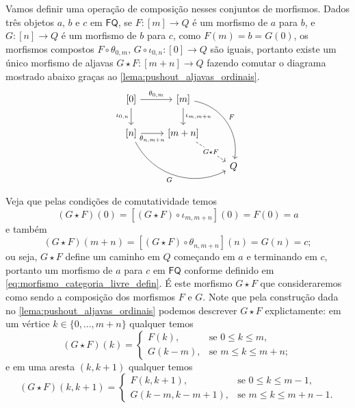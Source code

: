 Vamos definir uma operação de composição nesses conjuntos de morfismos.
Dados três objetos $a$, $b$ e $c$ em $\mathsf{FQ}$, se $F:[m] \to Q$ é um morfismo de $a$ para $b$, e $G:[n] \to Q$ é um morfismo de $b$ para $c$, como $F(m) = b = G(0)$, os morfismos compostos $F \circ \theta_{0,m},\, G \circ \iota_{0,n}: [0] \to Q$ são iguais, portanto existe um único morfismo de aljavas $G \star F: [m+n] \to Q$ fazendo comutar o diagrama mostrado abaixo graças ao \cref{lema:pushout_aljavas_ordinais}.
\begin{displaymath}
    \begin{tikzcd}
        {[0]}
        \arrow[r, "{\theta_{0,m}}"]
        \arrow[d, "{\iota_{0,n}}" swap]
        & {[m]}
        \arrow[d, "\iota_{m,m+n}"]
        \arrow[rdd, bend left=45, "F"]
        \\ {[n]}
        \arrow[r, "{\theta_{n,m+n}}" swap]
        \arrow[rrd, bend right=45, "G" swap]
        & {[m+n]}
        \arrow[rd, dashed, "G \star F" description]
        \\ & & Q
    \end{tikzcd}
\end{displaymath}
Veja que pelas condições de comutatividade temos
\begin{displaymath}
    (G \star F)(0) = [(G \star F) \circ \iota_{m,m+n}](0) = F(0) = a
\end{displaymath}
e também
\begin{displaymath}
    (G \star F)(m+n) = [(G \star F) \circ \theta_{n,m+n}](n) = G(n) = c;
\end{displaymath}
ou seja, $G \star F$ define um caminho em $Q$ começando em $a$ e terminando em $c$, portanto um morfismo de $a$ para $c$ em $\mathsf{FQ}$ conforme definido em \eqref{eq:morfismo_categoria_livre_defin}.
É este morfismo $G \star F$ que consideraremos como sendo a composição dos morfismos $F$ e $G$.
Note que pela construção dada no \cref{lema:pushout_aljavas_ordinais} podemos descrever $G \star F$ explictamente: em um vértice $k \in \{0,\dots,m+n\}$ qualquer temos
\begin{displaymath}
    (G \star F)(k) =
    \begin{cases}
        F(k), & \text{se } 0 \leq k \leq m, \\
        G(k-m), & \text{se } m \leq k \leq m+n;
    \end{cases}
\end{displaymath}
e em uma aresta $(k,k+1)$ qualquer temos
\begin{displaymath}
    (G \star F)(k,k+1) =
    \begin{cases}
        F(k,k+1), & \text{se } 0 \leq k \leq m-1, \\
        G(k-m,k-m+1), & \text{se } m \leq k \leq m+n-1.
    \end{cases}
\end{displaymath}

